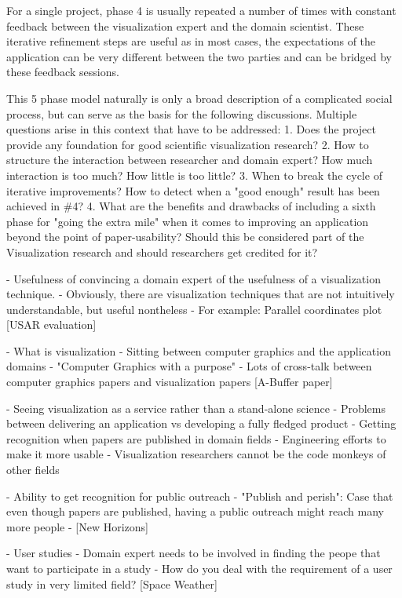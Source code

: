 For a single project, phase 4 is usually repeated a number of times with constant feedback between the visualization expert and the domain scientist. These iterative refinement steps are useful as in most cases, the expectations of the application can be very different between the two parties and can be bridged by these feedback sessions.

This 5 phase model naturally is only a broad description of a complicated social process, but can serve as the basis for the following discussions. Multiple questions arise in this context that have to be addressed:
 1. Does the project provide any foundation for good scientific visualization research?
 2. How to structure the interaction between researcher and domain expert? How much interaction is too much? How little is too little?
 3. When to break the cycle of iterative improvements? How to detect when a "good enough" result has been achieved in \#4?
 4. What are the benefits and drawbacks of including a sixth phase for "going the extra mile" when it comes to improving an application beyond the point of paper-usability? Should this be considered part of the Visualization research and should researchers get credited for it?


 - Usefulness of convincing a domain expert of the usefulness of a visualization technique.
 - Obviously, there are visualization techniques that are not intuitively understandable, but useful nontheless
 - For example: Parallel coordinates plot [USAR evaluation]

- What is visualization
 - Sitting between computer graphics and the application domains
 - "Computer Graphics with a purpose"
 - Lots of cross-talk between computer graphics papers and visualization papers [A-Buffer paper]

- Seeing visualization as a service rather than a stand-alone science
 - Problems between delivering an application vs developing a fully fledged product
 - Getting recognition when papers are published in domain fields
 - Engineering efforts to make it more usable
 - Visualization researchers cannot be the code monkeys of other fields

- Ability to get recognition for public outreach
 - "Publish and perish": Case that even though papers are published, having a public outreach might reach many more people
 - [New Horizons]

- User studies
 - Domain expert needs to be involved in finding the peope that want to participate in a study
 - How do you deal with the requirement of a user study in very limited field? [Space Weather]

